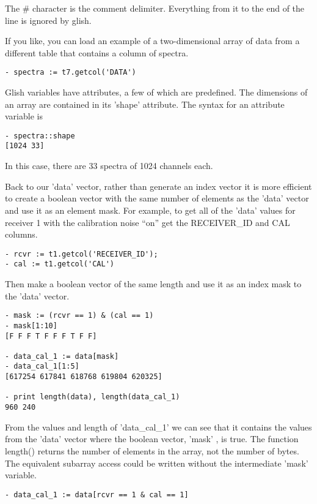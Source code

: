The \# character is the comment delimiter.  Everything from it to the end of
the line is ignored by glish.

    If you like, you can load an example of a two-dimensional array of data
from a different table that contains a column of spectra.

\begin{verbatim}
- spectra := t7.getcol('DATA')
\end{verbatim}

    Glish variables have attributes, a few of which are predefined.  The
dimensions of an array are contained in its 'shape' attribute.  The syntax
for an attribute variable is

\begin{verbatim}
- spectra::shape
[1024 33]
\end{verbatim}

In this case, there are 33 spectra of 1024 channels each.

    Back to our 'data' vector, rather than generate an index vector it is
more efficient to create a boolean vector with the same number of elements
as the 'data' vector and use it as an element mask.  For example, to get
all of the 'data' values for receiver 1 with the calibration noise ``on'' get
the RECEIVER\_ID and CAL columns.

\begin{verbatim}
- rcvr := t1.getcol('RECEIVER_ID');
- cal := t1.getcol('CAL')
\end{verbatim}

Then make a boolean vector of the same length and use it as an index mask
to the 'data' vector.

\begin{verbatim}
- mask := (rcvr == 1) & (cal == 1)
- mask[1:10]
[F F F T F F F T F F]  

- data_cal_1 := data[mask]
- data_cal_1[1:5]
[617254 617841 618768 619804 620325]

- print length(data), length(data_cal_1)
960 240
\end{verbatim}

From the values and length of 'data\_cal\_1' we can see that it contains the
values from the 'data' vector where the boolean vector, 'mask' , is true.
The function length() returns the number of elements in the array, not the
number of bytes.  The equivalent subarray access could be written without
the intermediate 'mask' variable.

\begin{verbatim}
- data_cal_1 := data[rcvr == 1 & cal == 1]
\end{verbatim}

